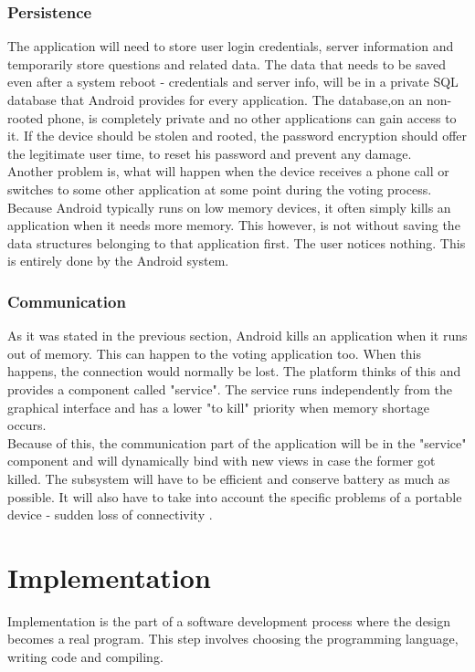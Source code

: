 \documentclass[11pt,twoside,a4paper]{book}
\begin{document}
\subsection{Persistence}
The application will need to store user login credentials, server information and temporarily store questions and related data. The data that needs to be saved even after a system reboot - credentials and server info, will be in a private SQL database that Android provides for every application. The database,on an non-rooted\cite{whatIsRoot}  phone,  is completely private and no other applications can gain access to it. If the device should be stolen and rooted, the password encryption should offer the legitimate user time, to reset his password and prevent any damage. \\
Another problem is, what will happen when the device receives a phone call or switches to some other application \cite{bakalarkaJV} at some point during the voting process. Because Android typically runs on low memory devices, it often simply kills an application when it needs more memory. This however, is not without saving the data structures belonging to that application first. The user notices nothing. This is entirely done by the Android system.\\

\subsection{Communication}
As it was stated in the previous section, Android kills an application when it runs out of memory. This can happen to the voting application too. When this happens, the connection would normally be lost. The platform thinks of this and provides a component called "service". The service runs independently from the graphical interface and has a lower "to kill" priority when memory shortage occurs. \\

Because of this, the communication part of the application will be in the "service" component and will dynamically bind with new views in case the former got killed. The subsystem will have to be efficient and conserve battery as much as possible. It will also have to take into account the specific problems of a portable device - sudden loss of connectivity \cite{bakalarkaJV}. 




	
\chapter{Implementation}
Implementation is the part of a software development process where the design becomes a real program. This step involves choosing the programming language, writing code and compiling.
\end{document}
